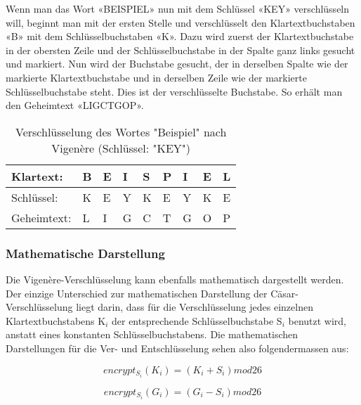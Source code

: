 Wenn man das Wort «BEISPIEL» nun mit dem Schlüssel «KEY» verschlüsseln will, beginnt man mit der ersten Stelle und verschlüsselt den Klartextbuchstaben «B» mit dem Schlüsselbuchstaben «K». Dazu wird zuerst der Klartextbuchstabe in der obersten Zeile und der Schlüsselbuchstabe in der Spalte ganz links gesucht und markiert. Nun wird der Buchstabe gesucht, der in derselben Spalte wie der markierte Klartextbuchstabe und in derselben Zeile wie der markierte Schlüsselbuchstabe steht. Dies ist der verschlüsselte Buchstabe. So erhält man den Geheimtext «LIGCTGOP».

\begin{table}[h!]
\centering
\caption{Verschlüsselung des Wortes "Beispiel" nach Vigenère (Schlüssel: "KEY")}
\label{tab:verschluesselung-vigenere-beispiel-key}
\begin{tabular}{|l|llllllll|}
\hline
Klartext:   & B & E & I & S & P & I & E & L \\ \hline
Schlüssel:  & K & E & Y & K & E & Y & K & E \\ \hline
Geheimtext: & L & I & G & C & T & G & O & P \\ \hline
\end{tabular}%
\end{table}


\subsubsection{Mathematische Darstellung}
\label{sec:v-mathematische-darstellung}
Die Vigenère-Verschlüsselung kann ebenfalls mathematisch dargestellt werden. Der einzige Unterschied zur mathematischen Darstellung der Cäsar-Verschlüsselung liegt darin, dass für die Verschlüsselung jedes einzelnen Klartextbuchstabens K$_i$ der entsprechende Schlüsselbuchstabe S$_i$ benutzt wird, anstatt eines konstanten Schlüsselbuchstabens. Die mathematischen Darstellungen für die Ver- und Entschlüsselung sehen also folgendermassen aus:

\begin{equation}
encrypt_{S_{i}}(K_{i})=(K_{i}+S_{i}) mod 26
\end{equation}

\begin{equation}
encrypt_{S_{i}}(G_{i})=(G_{i}-S_{i}) mod 26
\end{equation}


